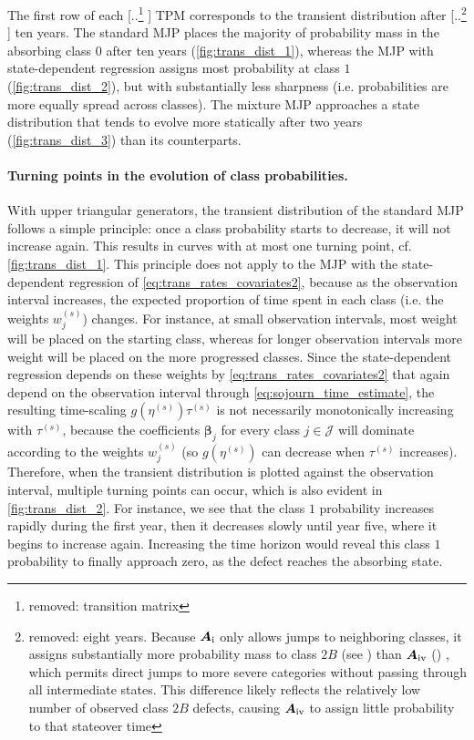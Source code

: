 \documentclass{article}
\newcommand{\RN}[1]{\textup{\uppercase\expandafter{\romannumeral#1}}}
\providecommand{\DIFadd}[1]{{\protect\color{blue} \sf #1}} %
\providecommand{\DIFdel}[1]{{\protect\color{red} [..\footnote{removed: #1} ]}} %
\providecommand{\DIFaddbegin}{} %
\providecommand{\DIFaddend}{} %
\providecommand{\DIFdelbegin}{} %
\providecommand{\DIFdelend}{} %
\begin{document}
\DIFaddbegin 

\DIFaddend The first row of each \DIFdelbegin \DIFdel{transition matrix }\DIFdelend \DIFaddbegin \DIFadd{TPM }\DIFaddend corresponds to the transient distribution after \DIFdelbegin \DIFdel{eight years. 
Because $\bm{A}_{\RN{1}}$ only allows jumps to neighboring classes, it assigns substantially more probability mass to class $2B$ (see \Cref{fig:trans_dist_gerlang}) than $\bm{A}_{\RN{4}}$ (\Cref{fig:trans_dist_tridiagonal}) , which permits direct jumps to more severe categories without passing through all intermediate states.
This difference likely reflects the relatively low number of observed class $2B$ defects, causing $\bm{A}_{\RN{4}}$ to assign little probability to that stateover time}\DIFdelend \DIFaddbegin \DIFadd{ten years. 
The standard MJP places the majority of probability mass in the absorbing class $0$ after ten years (\cref{fig:trans_dist_1}), whereas the MJP with state-dependent regression assigns most probability at class $1$ (\cref{fig:trans_dist_2}), but with substantially less sharpness (i.e. probabilities are more equally spread across classes). The mixture MJP approaches a state distribution that tends to evolve more statically after two years (\cref{fig:trans_dist_3}) than its counterparts.
}

\paragraph{\DIFadd{Turning points in the evolution of class probabilities.}} \label{sec:turning_points}
\DIFadd{With upper triangular generators, the transient distribution of the standard MJP follows a simple principle: once a class probability starts to decrease, it will not increase again. This results in curves with at most one turning point, cf. \cref{fig:trans_dist_1}. 
This principle does not apply to the MJP with the state-dependent regression of \cref{eq:trans_rates_covariates2}, because as the observation interval increases, the expected proportion of time spent in each class (i.e. the weights $w_j^{(s)}$) changes. For instance, at small observation intervals, most weight will be placed on the starting class, whereas for longer observation intervals more weight will be placed on the more progressed classes.
Since the state-dependent regression depends on these weights by \cref{eq:trans_rates_covariates2} that again depend on the observation interval through \cref{eq:sojourn_time_estimate}, the resulting time-scaling $g(\eta^{(s)}) \tau^{(s)}$ is not necessarily monotonically increasing with $\tau^{(s)}$, because the coefficients $\bm \beta_j$ for every class $j \in \mathcal J$ will dominate according to the weights $w_j^{(s)}$ (so $g(\eta^{(s)})$ can decrease when $\tau^{(s)}$ increases).
Therefore, when the transient distribution is plotted against the observation interval, multiple turning points can occur, which is also evident in \cref{fig:trans_dist_2}. For instance, we see that the class $1$ probability increases rapidly during the first year, then it decreases slowly until year five, where it begins to increase again. Increasing the time horizon would reveal this class $1$ probability to finally approach zero, as the defect reaches the absorbing state}\DIFaddend .
\end{document}
